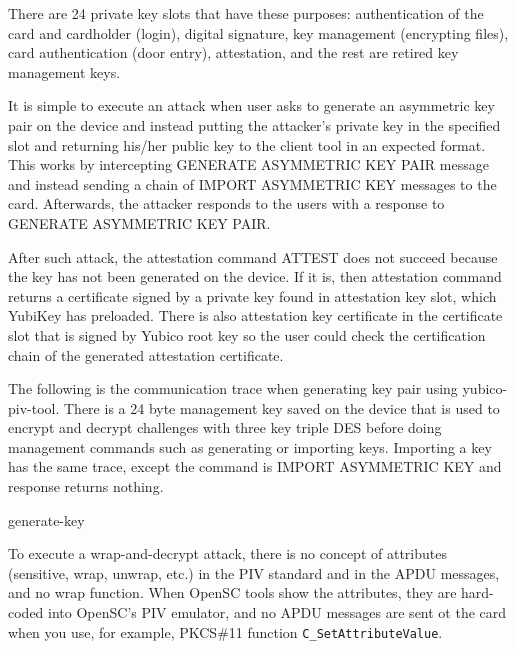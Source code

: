 \documentclass[a4paper]{article}
\begin{document}
There are 24 private key slots that have these purposes: authentication of the card and cardholder (login), digital signature, key management (encrypting files), card authentication (door entry), attestation, and the rest are retired key management keys.

It is simple to execute an attack when user asks to generate an asymmetric key pair on the device and instead putting the attacker's private key in the specified slot and returning his/her public key to the client tool in an expected format. This works by intercepting GENERATE ASYMMETRIC KEY PAIR message and instead sending a chain of IMPORT ASYMMETRIC KEY messages to the card. Afterwards, the attacker responds to the users with a response to GENERATE ASYMMETRIC KEY PAIR.

After such attack, the attestation command ATTEST does not succeed because the key has not been generated on the device. If it is, then attestation command returns a certificate signed by a private key found in attestation key slot, which YubiKey has preloaded. There is also attestation key certificate in the certificate slot that is signed by Yubico root key so the user could check the certification chain of the generated attestation certificate.

The following is the communication trace when generating key pair using yubico-piv-tool. There is a 24 byte management key saved on the device that is used to encrypt and decrypt challenges with three key triple DES before doing management commands such as generating or importing keys. Importing a key has the same trace, except the command is IMPORT ASYMMETRIC KEY and response returns nothing.

\begin{msc}{generate-key}
\nextlevel
{}
\nextlevel
{}
\nextlevel
{}
\nextlevel[2]
\nextlevel
{}
\nextlevel[2]
\nextlevel
{}
\nextlevel
\end{msc}



To execute a wrap-and-decrypt attack, there is no concept of attributes (sensitive, wrap, unwrap, etc.) in the PIV standard and in the APDU messages, and no wrap function. When OpenSC tools show the attributes, they are hard-coded into OpenSC's PIV emulator, and no APDU messages are sent ot the card when you use, for example, PKCS\#11 function \texttt{C\_SetAttributeValue}.
\end{document}

